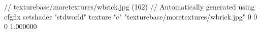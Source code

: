 // texturebase/moretextures/wbrick.jpg (162)
// Automatically generated using cfgfix
setshader "stdworld"
texture "c" "texturebase/moretextures/wbrick.jpg" 0 0 0 1.000000
